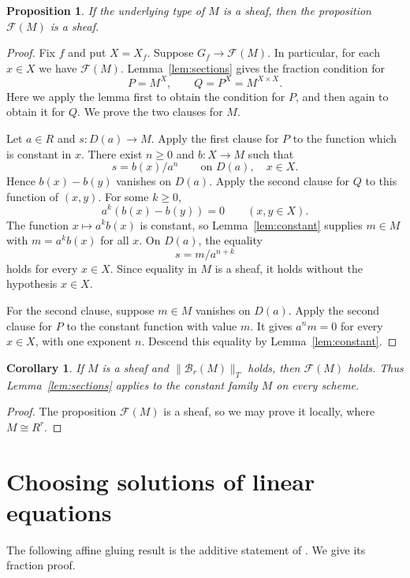 \documentclass[11pt]{amsart}
\newtheorem{proposition}[theorem]{Proposition}
\newtheorem{corollary}[theorem]{Corollary}
\theoremstyle{definition}
\newcommand{\Bas}{\mathcal B}
\newcommand{\Frac}{\mathcal F}
\newcommand{\loc}[1]{\lVert #1\rVert_T}
\begin{document}
\begin{proposition}\label{prop:fractions-descend}
If the underlying type of $M$ is a sheaf, then the proposition
$\Frac(M)$ is a sheaf.
\end{proposition}
\begin{proof}
Fix $f$ and put $X=X_f$. Suppose $G_f\to\Frac(M)$. In particular, for
each $x\in X$ we have $\Frac(M)$. Lemma~\ref{lem:sections} gives the
fraction condition for
\[
 P=M^X,\qquad Q=P^X=M^{X\times X}.
\]
Here we apply the lemma first to obtain the condition for $P$, and then
again to obtain it for $Q$. We prove the two clauses for $M$.

Let $a\in R$ and $s:D(a)\to M$. Apply the first clause for $P$ to the
function which is constant in $x$. There exist $n\geq0$ and $b:X\to M$
such that
\[
 s=b(x)/a^n\qquad\text{on }D(a),\quad x\in X.
\]
Hence $b(x)-b(y)$ vanishes on $D(a)$. Apply the second clause for $Q$
to this function of $(x,y)$. For some $k\geq0$,
\[
 a^k(b(x)-b(y))=0\qquad(x,y\in X).
\]
The function $x\mapsto a^kb(x)$ is constant, so
Lemma~\ref{lem:constant} supplies $m\in M$ with $m=a^kb(x)$ for all
$x$. On $D(a)$, the equality
\[
 s=m/a^{n+k}
\]
holds for every $x\in X$. Since equality in $M$ is a sheaf, it holds
without the hypothesis $x\in X$.

For the second clause, suppose $m\in M$ vanishes on $D(a)$. Apply the
second clause for $P$ to the constant function with value $m$. It gives
$a^nm=0$ for every $x\in X$, with one exponent $n$. Descend this equality
by Lemma~\ref{lem:constant}.
\end{proof}

\begin{corollary}\label{cor:local-free-fractions}
If $M$ is a sheaf and $\loc{\Bas_r(M)}$ holds, then $\Frac(M)$ holds.
Thus Lemma~\ref{lem:sections} applies to the constant family $M$ on
every scheme.
\end{corollary}
\begin{proof}
The proposition $\Frac(M)$ is a sheaf, so we may prove it locally,
where $M\cong R^r$.
\end{proof}

\section{Choosing solutions of linear equations}

The following affine gluing result is the additive statement of
\cite[Theorem~7.3.6]{SAG}. We give its fraction proof.
\end{document}
